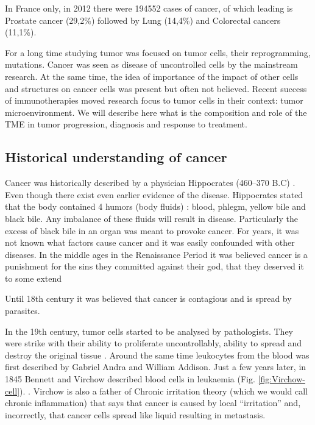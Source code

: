 \documentclass[12pt,]{book}
\theoremstyle{definition}
\theoremstyle{definition}
\theoremstyle{definition}
\theoremstyle{remark}
\begin{document}
In France only, in 2012 there were 194552 cases of cancer, of which
leading is Prostate cancer (29,2\%) followed by Lung (14,4\%) and
Colorectal cancers (11,1\%).

For a long time studying tumor was focused on tumor cells, their
reprogramming, mutations. Cancer was seen as disease of uncontrolled
cells by the mainstream research. At the same time, the idea of
importance of the impact of other cells and structures on cancer cells
was present but often not believed. Recent success of immunotherapies
moved research focus to tumor cells in their context: tumor
microenvironment. We will describe here what is the composition and role
of the TME in tumor progression, diagnosis and response to treatment.

\hypertarget{hist}{%
\subsection{Historical understanding of cancer}\label{hist}}

Cancer was historically described by a physician Hippocrates (460--370
B.C) \citep{Sudhakar2009}. Even though there exist even earlier evidence
of the disease. Hippocrates stated that the body contained 4 humors
(body fluids) : blood, phlegm, yellow bile and black bile. Any imbalance
of these fluids will result in disease. Particularly the excess of black
bile in an organ was meant to provoke cancer. For years, it was not
known what factors cause cancer and it was easily confounded with other
diseases. In the middle ages in the Renaissance Period it was believed
cancer is a punishment for the sins they committed against their god,
that they deserved it to some extend

Until 18th century it was believed that cancer is contagious and is
spread by parasites.

In the 19th century, tumor cells started to be analysed by pathologists.
They were strike with their ability to proliferate uncontrollably,
ability to spread and destroy the original tissue \citep{NPR2010}.
Around the same time leukocytes from the blood was first described by
Gabriel Andra and William Addison. Just a few years later, in 1845
Bennett and Virchow described blood cells in leukaemia (Fig.
\ref{fig:Virchow-cell}). . Virchow is also a father of Chronic
irritation theory (which we would call chronic inflammation) that says
that cancer is caused by local ``irritation'' and, incorrectly, that
cancer cells spread like liquid resulting in metastasis.
\end{document}
